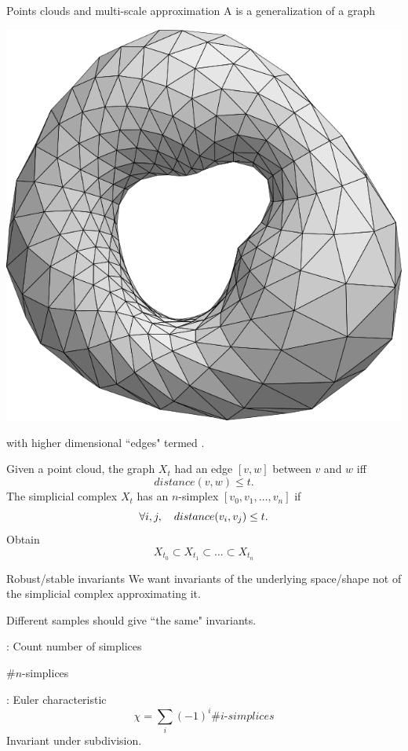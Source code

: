 \begin{frame}{Points clouds and multi-scale approximation}
	\pause
	A  is a generalization of a graph
	\begin{center}
		\includegraphics[scale=.1]{aux/torus_triangulated}
	\end{center}
	with higher dimensional ``edges" termed .

	\medskip\pause
	Given a point cloud, the graph $X_t$ had an edge $[v,w]$ between $v$ and $w$ iff
	\[
	distance(v,w) \leq t.
	\]
	\pause
	The simplicial complex $X_t$ has an $n$-simplex $[v_0,v_1,\dots,v_n]$ if
	\[
	\forall i,j, \quad distance(v_i,v_j) \leq t.
	\vspace*{-5pt}
	\]
	\vspace*{-5pt}\pause
	Obtain 
	\[
	X_{t_0} \subset X_{t_1} \subset\dots\subset X_{t_n}
	\]
\end{frame}

\begin{frame}{Robust/stable invariants}
	\pause
	We want invariants of the underlying space/shape not of the simplicial complex approximating it.

	\medskip
	 Different samples should give ``the same" invariants.

	\pause\bigskip
	: Count number of simplices
	\begin{center}
		$\#n$-simplices
	\end{center}
%
%
%
%

	\pause\bigskip
	: Euler characteristic
	\[
	\chi = \sum_i (-1)^i \#i\text{-}simplices
	\]
	\pause\medskip
	Invariant under subdivision.
\end{frame}

